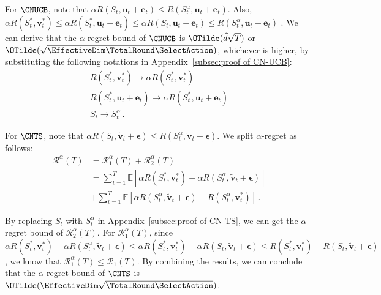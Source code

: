 \documentclass{article}
\theoremstyle{plain}
\begin{document}
For $\CNUCB$, note that $\alpha R(S_t,\mathbf{u}_t + \mathbf{e}_t) \le R(S_t^\alpha,\mathbf{u}_t + \mathbf{e}_t)$.
Also, $\alpha R(S_t^*, \mathbf{v}_t^*) \le \alpha R(S_t^*,\mathbf{u}_t + \mathbf{e}_t) \le \alpha R(S_t,\mathbf{u}_t + \mathbf{e}_t) \le R(S_t^\alpha,\mathbf{u}_t + \mathbf{e}_t) $ .  
We can derive that the $\alpha$-regret bound of $\CNUCB$ is $\OTilde(\tilde{d}\sqrt{T})$ or $\OTilde(\sqrt{ \EffectiveDim \TotalRound \SelectAction})$, whichever is higher, by substituting the following notations in Appendix~\ref{subsec:proof of CN-UCB}:
\begin{gather*}
    R(S_t^*, \mathbf{v}_t^*) \xrightarrow{} \alpha R(S_t^*, \mathbf{v}_t^*) \\ R(S_t^*,\mathbf{u}_t + \mathbf{e}_t) \xrightarrow{} \alpha R(S_t^*,\mathbf{u}_t + \mathbf{e}_t) \\ 
    S_t \xrightarrow{} S_t^\alpha \, .
\end{gather*}



For $\CNTS$, note that $\alpha R(S_t,\mathbf{\tilde{v}}_t + \boldsymbol{\epsilon}) \le R(S_t^\alpha,\mathbf{\tilde{v}}_t + \boldsymbol{\epsilon})$.
We split $\alpha$-regret as follows:
\begin{align*}
    \mathcal{R}^{\alpha}(T) & = \mathcal{R}_1^{\alpha}(T) + \mathcal{R}_2^{\alpha}(T) \\
    & = \sum_{t=1}^{T} \mathbb{E} \left[ \alpha R(S_t^*, \mathbf{v}_t^*) - \alpha R(S_t^\alpha, \mathbf{\tilde{v}}_t + \boldsymbol{\epsilon}) \right] \\
    & + \sum_{t=1}^{T} \mathbb{E} \left[ \alpha R(S_t^\alpha, \mathbf{\tilde{v}}_t + \boldsymbol{\epsilon}) - R(S_t^\alpha, \mathbf{v}_t^*) \right] \, .
\end{align*}


By replacing $S_t$ with $S_t^\alpha$ in Appendix~\ref{subsec:proof of CN-TS}, we can get the $\alpha$-regret bound of $\mathcal{R}_2^{\alpha}(T)$. 
For $\mathcal{R}_1^{\alpha}(T)$, since 
$\alpha R(S_t^*, \mathbf{v}_t^*) - \alpha R(S_t^\alpha, \mathbf{\tilde{v}}_t + \boldsymbol{\epsilon})
\le \alpha R(S_t^*, \mathbf{v}_t^*) - \alpha R(S_t, \mathbf{\tilde{v}}_t + \boldsymbol{\epsilon}) 
\le R(S_t^*, \mathbf{v}_t^*) - R(S_t, \mathbf{\tilde{v}}_t + \boldsymbol{\epsilon})$, 
we know that $\mathcal{R}_1^{\alpha}(T) \le \mathcal{R}_1(T)$.  
By combining the results, we can conclude that the $\alpha$-regret bound of $\CNTS$ is $\OTilde(\EffectiveDim\sqrt{\TotalRound  \SelectAction})$.
\end{document}
